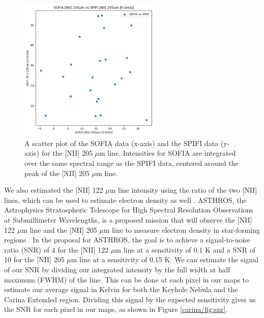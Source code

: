 \begin{figure}
    \centering
    \includegraphics[width=0.6\textwidth]{figs/carina/oberst.png}
    \caption[Scatter Plot of SPIFI and SOFIA {[NII]} 205 $\mu$m Line Intensities]{
        A scatter plot of the SOFIA data (x-axis) and the SPIFI data (y-axis) for the [NII] 205 $\mu$m line.
        Intensities for SOFIA are integrated over the same spectral range as the SPIFI data, centered around the peak of the [NII] 205 $\mu$m line.
        }
    \label{carina/fig:oberst}
\end{figure}

We also estimated the [NII] 122 $\mu$m line intensity using the ratio of the two [NII] lines, which can be used to estimate electron density as well \parencite{goldsmith2015herschel}.
ASTHROS, the Astrophysics Stratospheric Telescope for High Spectral Resolution Observations at Submillimeter Wavelengths, is a proposed mission that will observe the [NII] 122 $\mu$m line and the [NII] 205 $\mu$m line to measure electron density in star-forming regions \parencite{siles2020asthros}.
In the proposal for ASTHROS, the goal is to achieve a signal-to-noise ratio (SNR) of 4 for the [NII] 122 $\mu$m line at a sensitivity of 0.1 K and a SNR of 10 for the [NII] 205 $\mu$m line at a sensitivity of 0.15 K.
We can estimate the signal of our SNR by dividing our integrated intensity by the full width at half maximum (FWHM) of the line.
This can be done at each pixel in our maps to estimate our average signal in Kelvin for both the Keyhole Nebula and the Carina Extended region.
Dividing this signal by the expected sensitivity gives us the SNR for each pixel in our maps, as shown in Figure \ref{carina/fig:snr}.


